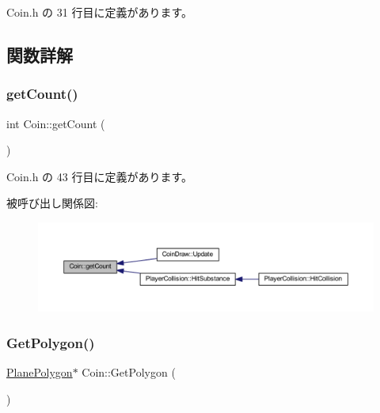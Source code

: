  Coin.\+h の 31 行目に定義があります。



\subsection{関数詳解}
\mbox{\label{class_coin_a5b302d3ad7be44267e1f4e6a54b0f23c}} 
\subsubsection{\texorpdfstring{get\+Count()}{getCount()}}
{\footnotesize\ttfamily int Coin\+::get\+Count (\begin{DoxyParamCaption}{ }\end{DoxyParamCaption})\hspace{0.3cm}{\ttfamily [inline]}}



 Coin.\+h の 43 行目に定義があります。

被呼び出し関係図\+:\nopagebreak
\begin{figure}[H]
\begin{center}
\leavevmode
\includegraphics[width=350pt]{class_coin_a5b302d3ad7be44267e1f4e6a54b0f23c_icgraph}
\end{center}
\end{figure}
\mbox{\label{class_coin_af435ca01cc92d7214e7bc94ed486ab7b}} 
\subsubsection{\texorpdfstring{Get\+Polygon()}{GetPolygon()}}
{\footnotesize\ttfamily \mbox{\hyperlink{class_plane_polygon}{Plane\+Polygon}}$\ast$ Coin\+::\+Get\+Polygon (\begin{DoxyParamCaption}{ }\end{DoxyParamCaption})\hspace{0.3cm}{\ttfamily [inline]}}



